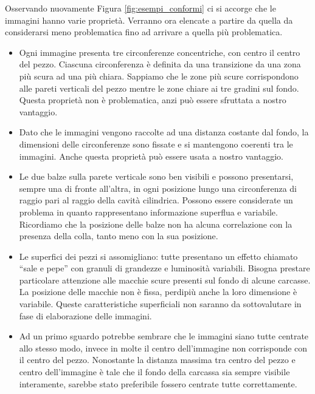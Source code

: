 Osservando nuovamente Figura \ref{fig:esempi_conformi} ci si accorge che le immagini hanno varie proprietà.
Verranno ora elencate a partire da quella da considerarsi meno problematica fino ad arrivare a quella più problematica.
\begin{itemize}

  \item Ogni immagine presenta tre circonferenze concentriche, con centro il centro del pezzo.
    Ciascuna circonferenza è definita da una transizione da una zona più scura ad una più chiara.
    Sappiamo che le zone più scure corrispondono alle pareti verticali del pezzo mentre le zone chiare ai tre gradini sul fondo.
    Questa proprietà non è problematica, anzi può essere sfruttata a nostro vantaggio.

  \item Dato che le immagini vengono raccolte ad una distanza costante dal fondo, la dimensioni delle circonferenze sono fissate e si mantengono coerenti tra le immagini.
    Anche questa proprietà può essere usata a nostro vantaggio.

  \item Le due balze sulla parete verticale sono ben visibili e possono presentarsi, sempre una di fronte all'altra, in ogni posizione lungo una circonferenza di raggio pari al raggio della cavità cilindrica.
    Possono essere considerate un problema in quanto rappresentano informazione superflua e variabile.
    Ricordiamo che la posizione delle balze non ha alcuna correlazione con la presenza della colla, tanto meno con la sua posizione.

  \item Le superfici dei pezzi si assomigliano: tutte presentano un effetto chiamato ``sale e pepe'' con granuli di grandezze e luminosità variabili.
    Bisogna prestare particolare attenzione alle macchie scure presenti sul fondo di alcune carcasse.
    La posizione delle macchie non è fissa, perdipiù anche la loro dimensione è variabile.
    Queste caratteristiche superficiali non saranno da sottovalutare in fase di elaborazione delle immagini.

  \item Ad un primo sguardo potrebbe sembrare che le immagini siano tutte centrate allo stesso modo, invece in molte il centro dell'immagine non corrisponde con il centro del pezzo.
    Nonostante la distanza massima tra centro del pezzo e centro dell'immagine è tale che il fondo della carcassa sia sempre visibile interamente, sarebbe stato preferibile fossero centrate tutte correttamente.
  

\end{itemize}
